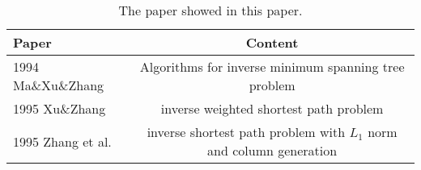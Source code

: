\documentclass[UTF8]{article}
\begin{document}
\begin{table}[ht]

 \tabcolsep=40pt

 \small\renewcommand{}

 \caption{The paper showed in this paper.\label{tab:9}}

 {\begin{tabular}{lc}
   \hline
   Paper               & Content                                                             \\
   \hline
   1994  Ma\&Xu\&Zhang & Algorithms for inverse minimum spanning tree problem                \\
   \hline
   1995 Xu\&Zhang      & inverse weighted shortest path problem                              \\
   \hline
   1995 Zhang et al.   & inverse shortest path problem with $L_1$ norm and column generation \\
   \hline
  \end{tabular}}
 {}
\end{table}
\end{document}
